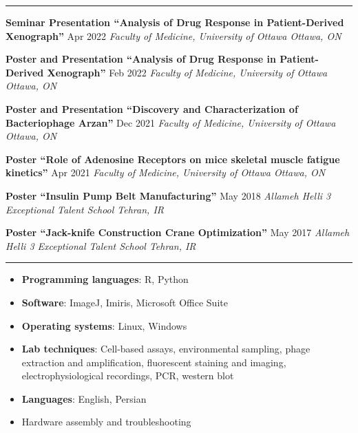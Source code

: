  \vspace{-1em}
\noindent

\rule{18cm}{0.5pt}

\textbf{Seminar Presentation ``Analysis of Drug Response in
Patient-Derived Xenograph''} \hfill Apr 2022 \linebreak \emph{Faculty of
Medicine, University of Ottawa \hfill Ottawa, ON}

\textbf{Poster and Presentation ``Analysis of Drug Response in
Patient-Derived Xenograph''} \hfill Feb 2022 \linebreak \emph{Faculty of
Medicine, University of Ottawa \hfill Ottawa, ON}

\textbf{Poster and Presentation ``Discovery and Characterization of
Bacteriophage Arzan''} \hfill Dec 2021 \linebreak  \emph{Faculty of
Medicine, University of Ottawa \hfill Ottawa, ON}

\textbf{Poster ``Role of Adenosine Receptors on mice skeletal muscle
fatigue kinetics''} \hfill Apr 2021 \linebreak  \emph{Faculty of
Medicine, University of Ottawa \hfill Ottawa, ON}

\textbf{Poster ``Insulin Pump Belt Manufacturing''} \hfill May 2018
\linebreak  \emph{Allameh Helli 3 Exceptional Talent School
\hfill Tehran, IR}

\textbf{Poster ``Jack-knife Construction Crane Optimization''}
\hfill May 2017 \linebreak  \emph{Allameh Helli 3 Exceptional Talent
School \hfill Tehran, IR}

\vspace{1em}

 \vspace{-1em} \noindent

\rule{18cm}{0.5pt}

\begin{itemize}
\tightlist
\item
  \textbf{Programming languages}: R, Python
\item
  \textbf{Software}: ImageJ, Imiris, Microsoft Office Suite
\item
  \textbf{Operating systems}: Linux, Windows
\item
  \textbf{Lab techniques}: Cell-based assays, environmental sampling,
  phage extraction and amplification, fluorescent staining and imaging,
  electrophysiological recordings, PCR, western blot
\item
  \textbf{Languages}: English, Persian
\item
  Hardware assembly and troubleshooting
\end{itemize}

